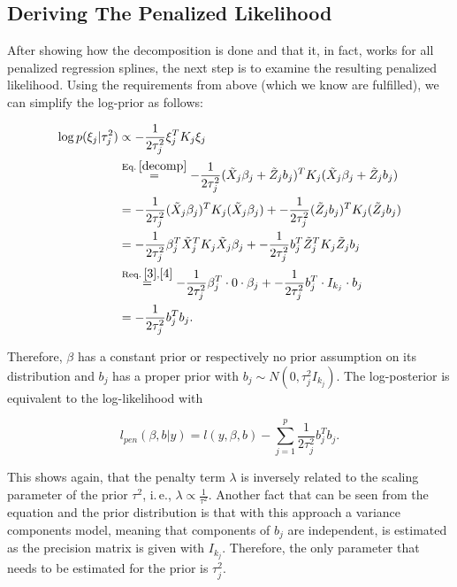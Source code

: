 \documentclass[12pt]{article}
\begin{document}
\subsection{Deriving The Penalized Likelihood}\label{likelihood}

After showing how the decomposition is done and that it, in fact, works for all penalized regression splines, the next step is to examine the resulting penalized likelihood. Using the requirements from above (which we know are fulfilled), we can simplify the log-prior as follows:


\begin{align*}
\log p(\xi_j|\tau_j^2)  &\propto -\frac{1}{2\tau^2_j} \xi_j^TK_j \xi_j\\ 
&\overset{\text{Eq.}\:\ref{decomp}}{=} -\frac{1}{2\tau^2_j} (\tilde{X}_j \beta_j + \tilde{Z}_j b_j)^TK_j (\tilde{X}_j \beta_j + \tilde{Z}_j b_j) \\
&= -\frac{1}{2\tau^2_j} (\tilde{X}_j \beta_j)^TK_j (\tilde{X}_j \beta_j) +
-\frac{1}{2\tau^2_j} (\tilde{Z}_j b_j)^TK_j (\tilde{Z}_j b_j)\\
&= -\frac{1}{2\tau^2_j} \beta_j^T \tilde{X}_j^T K_j \tilde{X}_j \beta_j +
-\frac{1}{2\tau^2_j} b_j^T \tilde{Z}_j^T K_j \tilde{Z}_j b_j\\
&\overset{\text{Req.}\:\ref{3},\ref{4}}{=} -\frac{1}{2\tau^2_j} \beta_j^T \cdot 0 \cdot \beta_j +
-\frac{1}{2\tau^2_j} b_j^T \cdot I_{k_j} \cdot b_j\\
&= -\frac{1}{2\tau_j^2} b_j^T b_j.
\end{align*}


Therefore, $\beta$ has a constant prior or respectively no prior assumption on its distribution and $b_j$ has a proper prior with $b_j \sim N(0,\tau_j^2I_{k_j})$. The log-posterior is equivalent to the log-likelihood with

$$l_{pen}(\beta,b|y) = l(y,\beta,b) - \sum_{j=1}^p \frac{1}{2\tau_j^2} b_j^T  b_j. $$

This shows again, that the penalty term $\lambda$ is inversely related to the scaling parameter of the prior $\tau^2$, i.\,e., $\lambda \propto \frac{1}{\tau^2}$. Another fact that can be seen from the equation and the prior distribution is that with this approach a variance components model, meaning that components of $b_j$ are independent, is estimated as the precision matrix is given with $I_{k_j}$. Therefore, the only parameter that needs to be estimated for the prior is $\tau^2_j$.
\end{document}
